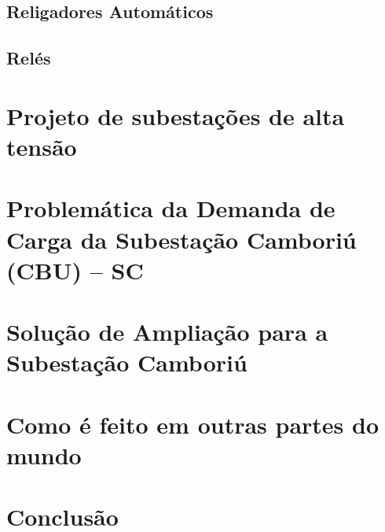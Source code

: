 	\section{Religadores Automáticos}

	\section{Relés}



\chapter{Projeto de subestações de alta tensão}
\label{chap:projSEAT}
\textcolor{red}{\lipsum}

\chapter{Problemática da Demanda de Carga da Subestação Camboriú (CBU) -- SC}
\label{chap:demCarga}
\textcolor{red}{\lipsum}

\chapter{Solução de Ampliação para a Subestação Camboriú}
\label{chap:solAmp}
\textcolor{red}{\lipsum}

\chapter{Como é feito em outras partes do mundo}
\label{chap:asbuiltAbroad}
\textcolor{red}{\lipsum}

\chapter*[Conclusão]{Conclusão}
\textcolor{red}{\lipsum}
